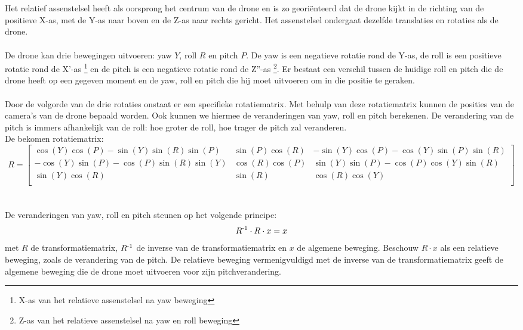 \\
\\
Het relatief assenstelsel heeft als oorsprong het centrum van de drone en is zo georiënteerd dat de drone kijkt in de richting van de positieve X-as, met de Y-as naar boven en de Z-as naar rechts gericht. Het assenstelsel ondergaat dezelfde translaties en rotaties als de drone.
\\
\\
De drone kan drie bewegingen uitvoeren: yaw \(Y\), roll \(R\) en pitch \(P\). De yaw is een negatieve rotatie rond de Y-as, de roll is een positieve rotatie rond de X'-as \footnote{X-as van  het relatieve assenstelsel na yaw beweging} en de pitch is een negatieve rotatie rond de Z''-as \footnote{Z-as van het relatieve assenstelsel na yaw en roll beweging}. Er bestaat een verschil tussen de huidige roll en pitch die de drone heeft op een gegeven moment en de yaw, roll en pitch die hij moet uitvoeren om in die positie te geraken.  
\\
\\
Door de volgorde van de drie rotaties onstaat er een specifieke rotatiematrix. Met behulp van deze rotatiematrix kunnen de posities van de camera's van de drone bepaald worden. Ook kunnen we hiermee de veranderingen van yaw, roll en pitch berekenen. De verandering van de pitch is immers afhankelijk van de roll: hoe groter de roll, hoe trager de pitch zal veranderen.
\\
De bekomen rotatiematrix: 
\begin{equation*}
R = 
\begin{bmatrix}
\cos(Y)\cos(P) -\sin(Y)\sin(R)\sin(P) & \sin(P)\cos(R) & -\sin(Y)\cos(P) - \cos(Y)\sin(P)\sin(R)\\
-\cos(Y)\sin(P) - \cos(P)\sin(R)\sin(Y) & \cos(R)\cos(P) & \sin(Y)\sin(P) - \cos(P)\cos(Y)\sin(R) \\ 
\sin(Y)\cos(R) & \sin(R) & \cos(R)\cos(Y)\\
\end{bmatrix} \label{rotatiematrix}
\end{equation*}
\\
\\
De veranderingen van yaw, roll en pitch steunen op het volgende principe:
\begin{equation*}
R\textsuperscript{-1} \cdot R \cdot x = x \label{rotatieBewegingVergelijking}
\end{equation*}
met \(R\) de transformatiematrix, \(R\textsuperscript{-1}\) de inverse van de transformatiematrix en \(x\) de algemene beweging. Beschouw \(R \cdot x\) als een relatieve beweging, zoals de verandering van de pitch. De relatieve beweging vermenigvuldigd met de inverse van de transformatiematrix geeft de algemene beweging die de drone moet uitvoeren voor zijn pitchverandering.
